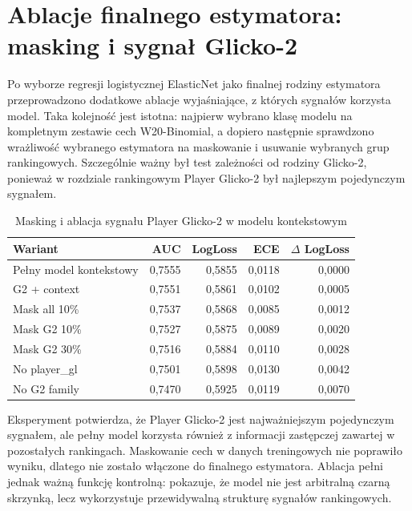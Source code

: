 \section{Ablacje finalnego estymatora: masking i sygnał Glicko-2}

Po wyborze regresji logistycznej ElasticNet jako finalnej rodziny estymatora przeprowadzono
dodatkowe ablacje wyjaśniające, z których sygnałów korzysta model. Taka kolejność jest istotna:
najpierw wybrano klasę modelu na kompletnym zestawie cech W20-Binomial, a dopiero następnie
sprawdzono wrażliwość wybranego estymatora na maskowanie i usuwanie wybranych grup rankingowych.
Szczególnie ważny był test zależności od rodziny Glicko-2, ponieważ w rozdziale rankingowym Player
Glicko-2 był najlepszym pojedynczym sygnałem.

\begin{table}[H]
    \centering
    \caption{Masking i ablacja sygnału Player Glicko-2 w modelu kontekstowym}
    \label{tab:logistic_masking_ablation}
    \begin{tabular}{lrrrr}
        \toprule
        Wariant & AUC & LogLoss & ECE & $\Delta$ LogLoss \\
        \midrule
        Pełny model kontekstowy & 0{,}7555 & 0{,}5855 & 0{,}0118 & 0{,}0000 \\
        G2 + context & 0{,}7551 & 0{,}5861 & 0{,}0102 & 0{,}0005 \\
        Mask all 10\% & 0{,}7537 & 0{,}5868 & 0{,}0085 & 0{,}0012 \\
        Mask G2 10\% & 0{,}7527 & 0{,}5875 & 0{,}0089 & 0{,}0020 \\
        Mask G2 30\% & 0{,}7516 & 0{,}5884 & 0{,}0110 & 0{,}0028 \\
        No player\_gl & 0{,}7501 & 0{,}5898 & 0{,}0130 & 0{,}0042 \\
        No G2 family & 0{,}7470 & 0{,}5925 & 0{,}0119 & 0{,}0070 \\
        \bottomrule
    \end{tabular}
\end{table}

Eksperyment potwierdza, że Player Glicko-2 jest najważniejszym pojedynczym sygnałem, ale pełny model
korzysta również z informacji zastępczej zawartej w pozostałych rankingach. Maskowanie cech w danych
treningowych nie poprawiło wyniku, dlatego nie zostało włączone do finalnego estymatora. Ablacja
pełni jednak ważną funkcję kontrolną: pokazuje, że model nie jest arbitralną czarną skrzynką, lecz
wykorzystuje przewidywalną strukturę sygnałów rankingowych.

